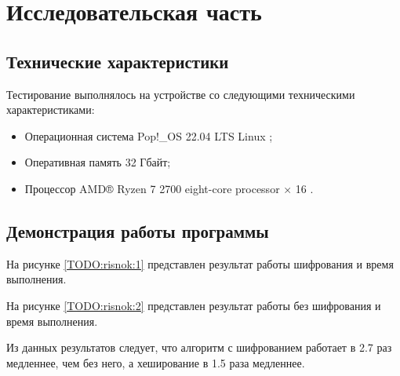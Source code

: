 \section{\large Исследовательская часть}

\subsection{Технические характеристики}

Тестирование выполнялось на устройстве со следующими техническими характеристиками:

\begin{itemize}
	\item Операционная система Pop!\_OS 22.04 LTS \cite{ubuntu} Linux \cite{linux};
	\item Оперативная память 32 Гбайт;
	\item Процессор AMD® Ryzen 7 2700 eight-core processor × 16 \cite{amd}.
\end{itemize}

\subsection{Демонстрация работы программы}

На рисунке \ref{TODO:risnok:1} представлен результат работы шифрования и время выполнения.

\begin{figure}[ht!]
\end{figure}

На рисунке \ref{TODO:risnok:2} представлен результат работы без шифрования и время выполнения.


\begin{figure}[ht!]
\end{figure}


Из данных результатов следует, что алгоритм с шифрованием работает в 2.7 раз медленнее, чем без него, а хеширование в 1.5 раза медленнее.

